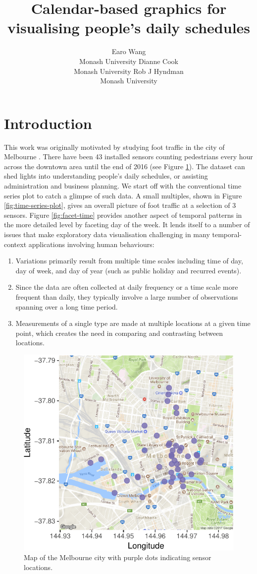 \documentclass[article]{jss}
\author{
Earo Wang\\Monash University \And Dianne Cook\\Monash University \And Rob J Hyndman\\Monash University
}
\title{Calendar-based graphics for visualising people's daily schedules}
\providecommand{\tightlist}{%
  \setlength{\itemsep}{0pt}\setlength{\parskip}{0pt}}
\begin{document}
\section{Introduction}\label{introduction}

This work was originally motivated by studying foot traffic in the city
of Melbourne \citep{ped}. There have been 43 installed sensors counting
pedestrians every hour across the downtown area until the end of 2016
(see Figure \ref{fig:ped-map}). The dataset can shed lights into
understanding people's daily schedules, or assisting administration and
business planning. We start off with the conventional time series plot
to catch a glimpse of such data. A small multiples, shown in Figure
\ref{fig:time-series-plot}, gives an overall picture of foot traffic at
a selection of 3 sensors. Figure \ref{fig:facet-time} provides another
aspect of temporal patterns in the more detailed level by faceting day
of the week. It lends itself to a number of issues that make exploratory
data visualisation challenging in many temporal-context applications
involving human behaviours:

\begin{enumerate}
\def\labelenumi{\arabic{enumi}.}
\tightlist
\item
  Variations primarily result from multiple time scales including time
  of day, day of week, and day of year (such as public holiday and
  recurred events). 
\item
  Since the data are often collected at daily frequency or a time scale
  more frequent than daily, they typically involve a large number of
  observations spanning over a long time period.
\item
  Measurements of a single type are made at multiple locations at a
  given time point, which creates the need in comparing and contrasting
  between locations.
\end{enumerate}

\begin{CodeChunk}
\begin{figure}

{\centering \includegraphics[width=0.55\linewidth]{figure/ped-map-1} 

}

\caption[Map of the Melbourne city with purple dots indicating sensor locations]{Map of the Melbourne city with purple dots indicating sensor locations.}\label{fig:ped-map}
\end{figure}
\end{CodeChunk}
\end{document}

